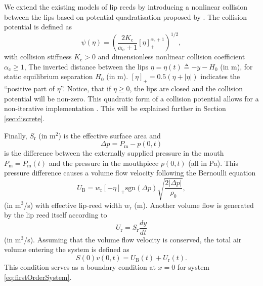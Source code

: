 We extend the existing models of lip reeds \cite{campbell2004brass} by introducing a nonlinear collision between the lips based on potential quadratisation proposed by \cite{Ducceschi2021}. The collision potential is defined as
\begin{equation}
    \psi(\eta) = \left(\frac{2K_\text{c}}{\alpha_\text{c}+1}[\eta]_+^{\alpha_\text{c}+1}
    \right)^{1/2}\!,
\end{equation}
with collision stiffness $K_\text{c}>0$ and dimensionless nonlinear collision coefficient $\alpha_\text{c}\geq 1$, The inverted distance between the lips $\eta = \eta(t) \triangleq -y-H_0$ (in m), for static equilibrium separation $H_0$ (in m). $[\eta]_+ = 0.5 (\eta + |\eta|)$ indicates the ``positive part of $\eta$''. Notice, that if $\eta 
\geq 0$, the lips are closed and the collision potential will be non-zero. This quadratic form of a collision potential allows for a non-iterative implementation \cite{Ducceschi2021}. This will be explained further in Section \ref{sec:discrete}.

Finally, $S_\text{r}$ (in m$^2$) is the effective surface area and 
\begin{equation}
    \Delta p = P_\text{m} - p(0,t)
\end{equation}
is the difference between the externally supplied pressure in the mouth $P_\text{m} = P_\text{m}(t)$ and the pressure in the mouthpiece $p(0, t)$ (all in Pa). This pressure difference causes a volume flow velocity following the Bernoulli equation
\begin{equation}
    U_\text{B} = w_\text{r}[-\eta]_+\text{sgn}(\Delta p) \sqrt{\frac{2|\Delta p|}{\rho_0}},
\end{equation}
(in m$^3$/s) with effective lip-reed width $w_\text{r}$ (m). %
Another volume flow is generated by the lip reed itself according to
\begin{equation}
    U_\text{r} = S_\text{r} \frac{dy}{dt}
\end{equation}
(in m$^3$/s).
Assuming that the volume flow velocity is conserved, the total air volume entering the system is defined as
\begin{equation}\label{eq:lipBoundary}
    S(0)v(0,t) = U_\text{B}(t) + U_\text{r}(t).
\end{equation}
This condition serves as a boundary condition at $x=0$ for system \eqref{eq:firstOrderSystem}.



